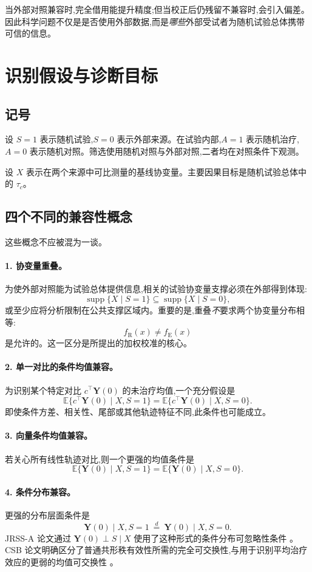 \documentclass[11pt]{article}
\newcommand{\R}{\mathrm{R}}
\newcommand{\E}{\mathrm{E}}
\newcommand{\Exp}{\mathbb{E}}
\newcommand{\supp}{\operatorname{supp}}
\begin{document}
当外部对照兼容时,完全借用能提升精度;但当校正后仍残留不兼容时,会引入偏差。因此科学问题不仅是是否使用外部数据,而是\emph{哪些}外部受试者为随机试验总体携带可信的信息。

\section{识别假设与诊断目标}

\subsection{记号}

设 $S=1$ 表示随机试验,$S=0$ 表示外部来源。在试验内部,$A=1$ 表示随机治疗,$A=0$ 表示随机对照。筛选使用随机对照与外部对照,二者均在对照条件下观测。

设 $X$ 表示在两个来源中可比测量的基线协变量。主要因果目标是随机试验总体中的 $\tau_c$。

\subsection{四个不同的兼容性概念}

这些概念不应被混为一谈。

\paragraph{1. 协变量重叠。}
为使外部对照能为试验总体提供信息,相关的试验协变量支撑必须在外部得到体现:
\[
\supp\{X\mid S=1\}\subseteq \supp\{X\mid S=0\},
\]
或至少应将分析限制在公共支撑区域内。重要的是,重叠\emph{不}要求两个协变量分布相等:
\[
f_{\R}(x)\neq f_{\E}(x)
\]
是允许的。这一区分是所提出的加权校准的核心。

\paragraph{2. 单一对比的条件均值兼容。}
为识别某个特定对比 $c^{\top}\bm Y(0)$ 的未治疗均值,一个充分假设是
\[
\Exp\{c^{\top}\bm Y(0)\mid X,S=1\}
=
\Exp\{c^{\top}\bm Y(0)\mid X,S=0\}.
\tag{ME-$c$}
\]
即使条件方差、相关性、尾部或其他轨迹特征不同,此条件也可能成立。

\paragraph{3. 向量条件均值兼容。}
若关心所有线性轨迹对比,则一个更强的均值条件是
\[
\Exp\{\bm Y(0)\mid X,S=1\}
=
\Exp\{\bm Y(0)\mid X,S=0\}.
\tag{VME}
\]

\paragraph{4. 条件分布兼容。}
更强的分布层面条件是
\[
\bm Y(0)\mid X,S=1
\ \overset{d}{=}\
\bm Y(0)\mid X,S=0.
\tag{DE}
\]
JRSS-A 论文通过 $\bm Y(0)\perp S\mid X$ 使用了这种形式的条件分布可忽略性条件 \citep{zhou2025causal}。CSB 论文明确区分了普通共形秩有效性所需的完全可交换性,与用于识别平均治疗效应的更弱的均值可交换性 \citep{zhu2025csb}。
\end{document}
